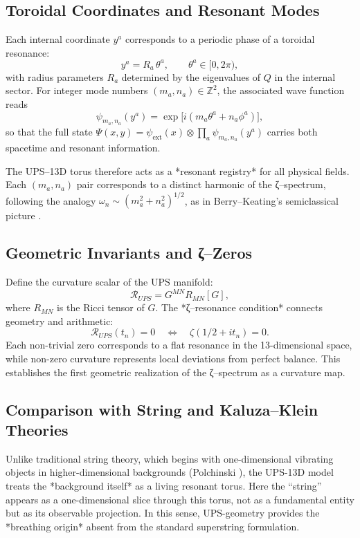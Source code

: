 \subsection{Toroidal Coordinates and Resonant Modes}

Each internal coordinate $y^a$ corresponds
to a periodic phase of a toroidal resonance:
\[
y^a = R_a \,\theta^a, \qquad
\theta^a \in [0,2\pi),
\]
with radius parameters $R_a$ determined by
the eigenvalues of $Q$ in the internal sector.
For integer mode numbers $(m_a,n_a)\in\mathbb{Z}^2$,
the associated wave function reads
\[
\psi_{m_a,n_a}(y^a) =
\exp\!\big[i(m_a\theta^a+n_a\phi^a)\big],
\]
so that the full state
$\Psi(x,y)=\psi_{\text{ext}}(x)\otimes
\prod_{a}\psi_{m_a,n_a}(y^a)$
carries both spacetime and resonant information.

The UPS–13D torus therefore acts as a *resonant registry*
for all physical fields.
Each $(m_a,n_a)$ pair corresponds to a distinct harmonic
of the ζ–spectrum, following the analogy
$\omega_n \sim (m_a^2+n_a^2)^{1/2}$,
as in Berry–Keating’s semiclassical picture
\cite{BerryKeating2008}.

\subsection{Geometric Invariants and ζ–Zeros}

Define the curvature scalar of the UPS manifold:
\[
\mathcal{R}_{UPS}
= G^{MN}R_{MN}[G],
\]
where $R_{MN}$ is the Ricci tensor of $G$.
The *ζ–resonance condition* connects geometry and arithmetic:
\[
\mathcal{R}_{UPS}(t_n)=0
\quad\Longleftrightarrow\quad
\zeta(1/2+i t_n)=0.
\]
Each non-trivial zero corresponds to a flat resonance
in the 13-dimensional space, while non-zero curvature
represents local deviations from perfect balance.
This establishes the first geometric realization
of the ζ–spectrum as a curvature map.

\subsection{Comparison with String and Kaluza–Klein Theories}

Unlike traditional string theory, which begins with
one-dimensional vibrating objects in higher-dimensional
backgrounds (Polchinski \cite{Polchinski1998}),
the UPS-13D model treats the *background itself*
as a living resonant torus.
Here the “string” appears as a one-dimensional slice
through this torus, not as a fundamental entity
but as its observable projection.
In this sense, UPS-geometry provides the
*breathing origin* absent from the standard
superstring formulation.

